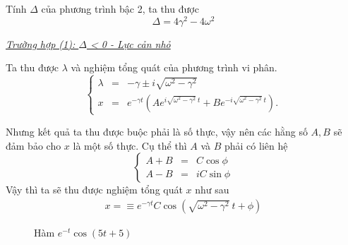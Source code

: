\documentclass[12pt]{article}
\begin{document}
Tính \(\Delta\) của phương trình bậc 2, ta thu được
\begin{equation}
    \Delta = 4 \gamma^2 - 4 \omega^2
    \label{eq:1.10}
\end{equation}
\vspace{2mm}

\underline{\textit{Trường hợp (1): $\Delta$ < 0 - Lực cản nhỏ}}

Ta thu được \(\lambda\) và nghiệm tổng quát của phương trình vi phân.
\begin{equation}
    \left\{
    \begin{array}{ccc}
    \lambda &=& - \gamma \pm  i \sqrt{\omega^2 - \gamma^2} \\
    x &=& e^{-\gamma t} \left(A e^{i\sqrt{\omega^2 - \gamma^2} \ t} + B e^{- i\sqrt{\omega^2 - \gamma^2} \ t} \right).
    \end{array}
    \right.
\end{equation}

Nhưng kết quả ta thu được buộc phải là số thực, vậy nên các hằng số $A, B$ sẽ đảm bảo cho $x$ là một số thực. Cụ thể thì $A$ và $B$ phải có liên hệ
\begin{equation*}
    \left\{
    \begin{array}{ccc}
    A + B &=& C \cos \phi \\
    A - B &=& i C \sin \phi
    \end{array}
    \right.
\end{equation*}
Vậy thì ta sẽ thu được nghiệm tổng quát \(x\) như sau
\begin{equation}
\begin{split}
    x = \equiv e^{-\gamma t} C \cos{\left(\sqrt{\omega^2 - \gamma^2} \ t + \phi \right)}
\end{split}
\end{equation}

\begin{figure}[!htb]
    \centering
    \caption{Hàm \(e^{-t} \cos{\left(5t + 5 \right)}\)}
    \label{fig:1.7}
\end{figure}
\end{document}
